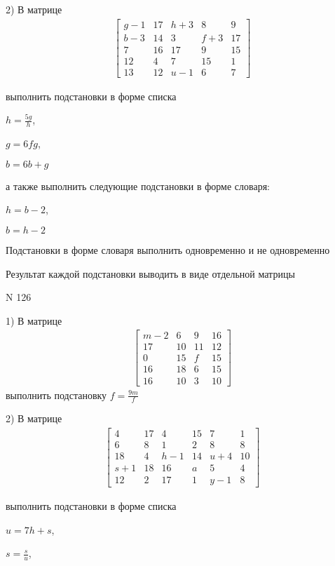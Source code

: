 \documentclass[11pt]{report}
\begin{document}
    2) В матрице
\begin{align*}
\left[\begin{matrix}g - 1 & 17 & h + 3 & 8 & 9\\b - 3 & 14 & 3 & f + 3 & 17\\7 & 16 & 17 & 9 & 15\\12 & 4 & 7 & 15 & 1\\13 & 12 & u - 1 & 6 & 7\end{matrix}\right]
\end{align*}

выполнить подстановки в форме списка

$h=\frac{5 g}{h}$,

$g=6 f g$,

$b=6 b + g$

а также выполнить следующие подстановки в форме словаря:

$h=b - 2$,

$b=h - 2$


    Подстановки в форме словаря выполнить одновременно и не одновременно


    Результат каждой подстановки выводить в виде отдельной матрицы

\newpage
N 126


    1) В матрице
\begin{align*}
\left[\begin{matrix}m - 2 & 6 & 9 & 16\\17 & 10 & 11 & 12\\0 & 15 & f & 15\\16 & 18 & 6 & 15\\16 & 10 & 3 & 10\end{matrix}\right]
\end{align*}
выполнить подстановку $f=\frac{9 m}{f}$


    2) В матрице
\begin{align*}
\left[\begin{matrix}4 & 17 & 4 & 15 & 7 & 1\\6 & 8 & 1 & 2 & 8 & 8\\18 & 4 & h - 1 & 14 & u + 4 & 10\\s + 1 & 18 & 16 & a & 5 & 4\\12 & 2 & 17 & 1 & y - 1 & 8\end{matrix}\right]
\end{align*}

выполнить подстановки в форме списка

$u=7 h + s$,

$s=\frac{s}{u}$,
\end{document}

